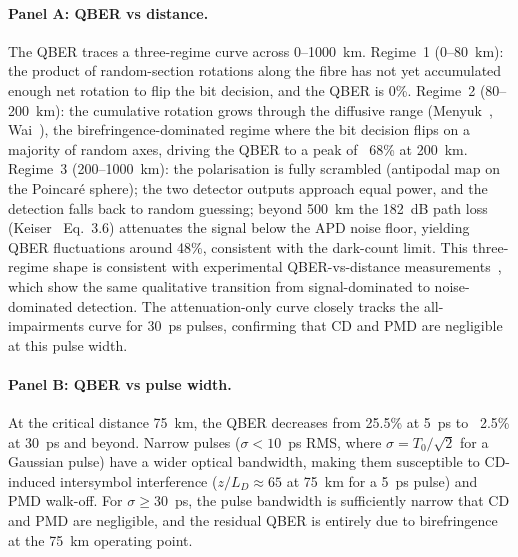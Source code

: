 \documentclass[11pt,a4paper]{article}
\begin{document}


\paragraph{Panel A: QBER vs distance.}
The QBER traces a three-regime curve across 0--1000~km.
Regime~1 (0--80~km): the product of random-section rotations along the
fibre has not yet accumulated enough net rotation to flip the bit
decision, and the QBER is 0\%.
Regime~2 (80--200~km): the cumulative rotation grows through the
diffusive range (Menyuk~\cite{menyuk}, Wai~\cite{wai}), the
birefringence-dominated regime where the bit decision flips on a
majority of random axes, driving the QBER to a peak of ~68\% at
200~km.
Regime~3 (200--1000~km): the polarisation is fully scrambled
(antipodal map on the Poincar\'e sphere); the two detector outputs
approach equal power, and the detection falls back to random guessing;
beyond 500~km the 182~dB path loss (Keiser~\cite{keiser} Eq.~3.6)
attenuates the signal below the APD noise floor, yielding QBER
fluctuations around 48\%, consistent with the dark-count limit.
This three-regime shape is consistent with experimental QBER-vs-distance
measurements~\cite{gobby,takesue}, which show the same qualitative
transition from signal-dominated to noise-dominated detection.
The attenuation-only curve closely tracks the all-impairments curve
for 30~ps pulses, confirming that CD and PMD are negligible at this
pulse width.

\paragraph{Panel B: QBER vs pulse width.}
At the critical distance 75~km, the QBER decreases from 25.5\% at
5~ps to ~2.5\% at 30~ps and beyond.  Narrow pulses ($\sigma < 10$~ps RMS, where $\sigma = T_0/\sqrt{2}$ for a Gaussian pulse)
have a wider optical bandwidth, making them susceptible to CD-induced
intersymbol interference ($z/L_D \approx 65$ at 75~km for a 5~ps pulse)
and PMD walk-off.  For $\sigma \ge 30$~ps, the pulse bandwidth is
sufficiently narrow that CD and PMD are negligible, and the residual
QBER is entirely due to birefringence at the 75~km operating point.
\end{document}
